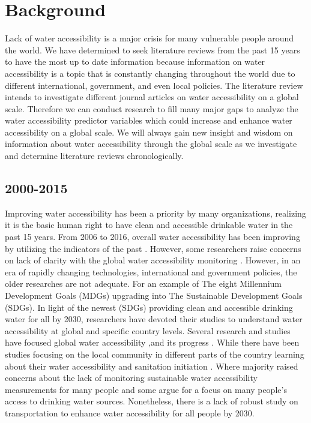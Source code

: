 \documentclass[10pt,twoside]{article}
\numberwithin{equation}{section}
\newcommand{\?}{\stackrel{?}{=}}
\begin{document}
\section{Background}
Lack of water accessibility is a major crisis for many vulnerable people around the world. We have determined to seek literature reviews from the past 15 years to have the most up to date information because information on water accessibility is a topic that is constantly changing throughout the world due to different international, government, and even local policies. The literature review intends to investigate different journal articles on water accessibility on a global scale. Therefore we can conduct research to fill many major gaps to analyze the water accessibility predictor variables which could increase and enhance water accessibility on a global scale. We will always gain new insight and wisdom on information about water accessibility through the global scale as we investigate and determine literature reviews chronologically. 
\subsection{2000-2015}
Improving water accessibility has been a priority by many organizations, realizing it is the basic human right to have clean and accessible drinkable water in the past 15 years. From 2006 to 2016, overall water accessibility has been improving by utilizing the indicators of the past \citep{fuller2016tracking}. However, some researchers raise concerns on lack of clarity with the global water accessibility monitoring \citep{onda2012global, jia2016highresolution}. However, in an era of rapidly changing technologies, international and government policies, the older researches are not adequate. For an example of The eight Millennium Development Goals (MDGs) upgrading into The Sustainable Development Goals (SDGs). In light of the newest (SDGs) providing clean and accessible drinking water for all by 2030, researchers have devoted their studies to understand water accessibility at global and specific country levels. Several research and studies have focused global water accessibility ,and its progress \citep{sorensonSafeAccessSafe2011,bainAccountingWaterQuality2012,pickering2012freshwater,wssccWaterSanitationHygiene2014,  onda2012global, bartram2014global, onda2014country, who2015drinkingwater,fuller2016tracking, weiyuyuGlobalPerspectiveDrinkingwater2016, grahamAnalysisWaterCollection2016,overboOnplotDrinkingWater2016}. While there have been studies focusing on the local community in different parts of the country learning about their water accessibility and sanitation initiation \citep{jagals2006does, geereDomesticWaterCarrying2010, sima2013water, ho2014challenge, sakisakaIntroductionCommunityWater2015, jia2016highresolution}. Where majority raised concerns about the lack of monitoring sustainable water accessibility measurements for many people and some argue for a focus on many people's access to drinking water sources. Nonetheless, there is a lack of robust study on transportation to enhance water accessibility for all people by 2030. 
\end{document}
